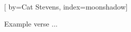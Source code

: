 
[%
    by={Cat Stevens},
    index={moonshadow}]


    \label{moonshadow}

    \beginverse
        Example verse ...
    \endverse
\endsong
